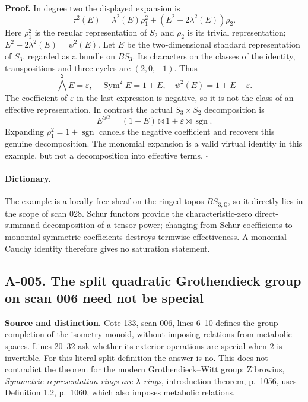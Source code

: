\textbf{Proof.} In degree two the displayed expansion is
\[
 \tau^2(E)=\lambda^2(E)\rho_1^2+
             (E^2-2\lambda^2(E))\rho_2.
\]
Here $\rho_1^2$ is the regular representation of $S_2$ and $\rho_2$ is its
trivial representation; $E^2-2\lambda^2(E)=\psi^2(E)$.
Let $E$ be the two-dimensional standard representation of $S_3$, regarded
as a bundle on $BS_3$.  Its characters on the classes of the identity,
transpositions and three-cycles are $(2,0,-1)$.  Thus
\[
 \bigwedge^2E=\varepsilon,\quad
 \operatorname{Sym}^2E=1+E,\quad
 \psi^2(E)=1+E-\varepsilon.
\]
The coefficient of $\varepsilon$ in the last expression is negative, so it
is not the class of an effective representation.  In contrast the actual
$S_3\times S_2$ decomposition is
\[
 E^{\otimes2}=(1+E)\boxtimes1+\varepsilon\boxtimes\operatorname{sgn}.
\]
Expanding $\rho_1^2=1+\operatorname{sgn}$ cancels the negative coefficient
and recovers this genuine decomposition.  The monomial expansion is a
valid virtual identity in this example, but not a decomposition into
effective terms. \hfill$\square$

\paragraph{Dictionary.}
The example is a locally free sheaf on the ringed topos $BS_{3,\mathbb Q}$,
so it directly lies in the scope of scan 028.  Schur functors provide the
characteristic-zero direct-summand decomposition of a tensor power; changing
from Schur coefficients to monomial symmetric coefficients destroys
termwise effectiveness.  A monomial Cauchy identity therefore gives no
saturation statement.

\subsection*{A-005. The split quadratic Grothendieck group on scan 006 need not be special}
\textbf{Source and distinction.} Cote 133, scan 006, lines 6--10 defines
the group completion of the isometry monoid, without imposing relations
from metabolic spaces.  Lines 20--32 ask whether its exterior operations
are special when $2$ is invertible.  For this literal split definition the
answer is no.  This does not contradict the theorem for the modern
Grothendieck--Witt group: Zibrowius, \emph{Symmetric representation rings
are $\lambda$-rings}, introduction theorem, p.~1056, uses Definition 1.2,
p.~1060, which also imposes metabolic relations.


